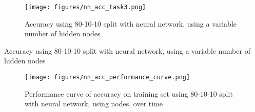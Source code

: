 \documentclass[paper=a4, fontsize=11pt,twoside]{scrartcl}	%
\newcommand{\figref}[1]{\figurename~\ref{#1}}
\newcommand{\tabref}[1]{\tablename~\ref{#1}}
\begin{document}
\begin{figure}[!t!h]
	\centering
	\texttt{[image: figures/nn\_acc\_task3.png]}
	\caption{Accuracy using 80-10-10 split with neural network, using a variable number of hidden nodes}
	\label{fig:nn_acc_task3}
\end{figure}

\begin{table}[!t!h]
	\centering
	
	\caption{Accuracy using 80-10-10 split with neural network, using a variable number of hidden nodes}
	\label{tab:nn_acc_task3}
\end{table}

\begin{figure}[!t!h]
	\centering
	\texttt{[image: figures/nn\_acc\_performance\_curve.png]}
	\caption{Performance curve of accuracy on training set using 80-10-10 split with neural network, using \protecthidden nodes, over time}
	\label{fig:nn_acc_performance_curve}
\end{figure}


%
%	

%	
\end{document}
